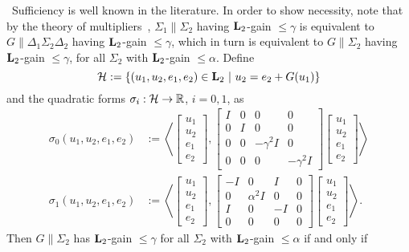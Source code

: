 \documentclass[11pt]{article}
\def\Real{\mathbb{R}} \def\Ints{\mathbb{Z}} \def\Natural{\mathbb{N}}
\newcommand{\Ltwo}{\boldsymbol{\rm L}_{2}}
\begin{document}
 \, Sufficiency is well known in the literature. In order to show necessity, note that by the theory of multipliers~\cite[Section
3.5]{GreLim95}, $\Sigma_1 \| \Sigma_2$ having $\Ltwo$-gain $\leq \gamma$ is equivalent to $G \| \Delta_1\Sigma_2\Delta_2$ having $\Ltwo$-gain
$\leq \gamma$, which in turn is equivalent to $G \| \Sigma_2$ having $\Ltwo$-gain $\leq \gamma$, for all  $\Sigma_2$ with $\Ltwo$-gain
$\leq \alpha$. Define
\[
\HH := \{(u_1, u_2, e_1, e_2) \in \Ltwo\ |\ u_2 = e_2 + G (u_1)\}
\]
and the quadratic forms $\sigma_i : \HH
\to \Real$, $i = 0, 1$, as 
\begin{align*}
 \sigma_0(u_1, u_2, e_1, e_2) & := \left\langle 
\begin{bmatrix} 
 u_1 \\
 u_2 \\
 e_1 \\
 e_2
\end{bmatrix},
\begin{bmatrix}
I & 0 & 0 & 0 \\
0 & I & 0 & 0 \\
0 & 0 & -\gamma^2 I & 0 \\
0 & 0 & 0 & -\gamma^2 I
\end{bmatrix}
\begin{bmatrix} 
 u_1 \\
 u_2 \\
 e_1 \\
 e_2
\end{bmatrix}
\right\rangle \\
 \sigma_1(u_1, u_2, e_1, e_2) & := \left\langle 
\begin{bmatrix} 
 u_1 \\
 u_2 \\
 e_1 \\
 e_2
\end{bmatrix},
\begin{bmatrix}
-I & 0 & I & 0 \\
0 & \alpha^2 I & 0 & 0 \\
I & 0 & -I & 0 \\
0 & 0 & 0 & 0
\end{bmatrix}
\begin{bmatrix} 
 u_1 \\
 u_2 \\
 e_1 \\
 e_2
\end{bmatrix}
\right\rangle.
\end{align*}
Then $G \| \Sigma_2$ has $\Ltwo$-gain $\leq \gamma$ for all $\Sigma_2$ with $\Ltwo$-gain $\leq \alpha$ if and only if
\end{document}
